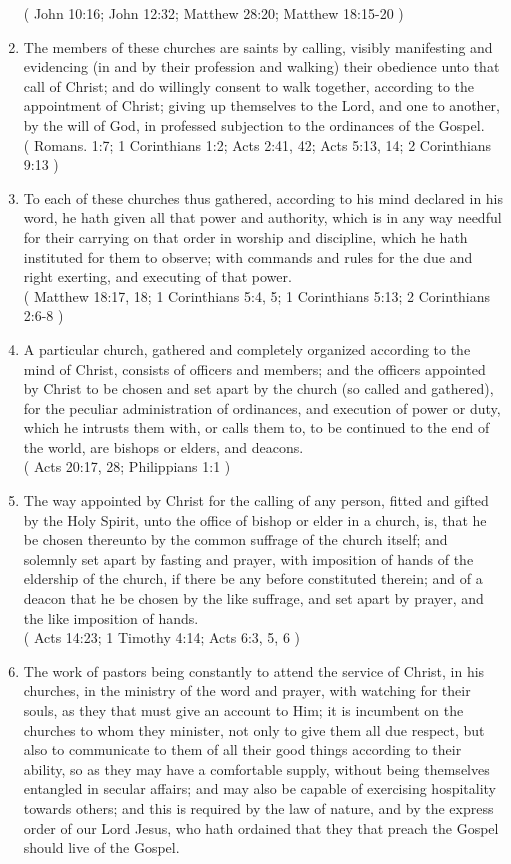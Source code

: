 \documentclass[12pt,a4paper]{book}
\begin{document}
\begin{enumerate}
( John 10:16; John 12:32; Matthew 28:20; Matthew 18:15-20 )
\item The members of these churches are saints by calling, visibly manifesting and evidencing (in and by their profession and walking) their obedience unto that call of Christ; and do willingly consent to walk together, according to the appointment of Christ; giving up themselves to the Lord, and one to another, by the will of God, in professed subjection to the ordinances of the Gospel.\\
( Romans. 1:7; 1 Corinthians 1:2; Acts 2:41, 42; Acts 5:13, 14; 2 Corinthians 9:13 )
\item To each of these churches thus gathered, according to his mind declared in his word, he hath given all that power and authority, which is in any way needful for their carrying on that order in worship and discipline, which he hath instituted for them to observe; with commands and rules for the due and right exerting, and executing of that power.\\
( Matthew 18:17, 18; 1 Corinthians 5:4, 5; 1 Corinthians 5:13; 2 Corinthians 2:6-8 )
\item A particular church, gathered and completely organized according to the mind of Christ, consists of officers and members; and the officers appointed by Christ to be chosen and set apart by the church (so called and gathered), for the peculiar administration of ordinances, and execution of power or duty, which he intrusts them with, or calls them to, to be continued to the end of the world, are bishops or elders, and deacons.\\
( Acts 20:17, 28; Philippians 1:1 )
\item The way appointed by Christ for the calling of any person, fitted and gifted by the Holy Spirit, unto the office of bishop or elder in a church, is, that he be chosen thereunto by the common suffrage of the church itself; and solemnly set apart by fasting and prayer, with imposition of hands of the eldership of the church, if there be any before constituted therein; and of a deacon that he be chosen by the like suffrage, and set apart by prayer, and the like imposition of hands.\\
( Acts 14:23; 1 Timothy 4:14; Acts 6:3, 5, 6 )
\item The work of pastors being constantly to attend the service of Christ, in his churches, in the ministry of the word and prayer, with watching for their souls, as they that must give an account to Him; it is incumbent on the churches to whom they minister, not only to give them all due respect, but also to communicate to them of all their good things according to their ability, so as they may have a comfortable supply, without being themselves entangled in secular affairs; and may also be capable of exercising hospitality towards others; and this is required by the law of nature, and by the express order of our Lord Jesus, who hath ordained that they that preach the Gospel should live of the Gospel.\\

\end{enumerate}
\end{document}
